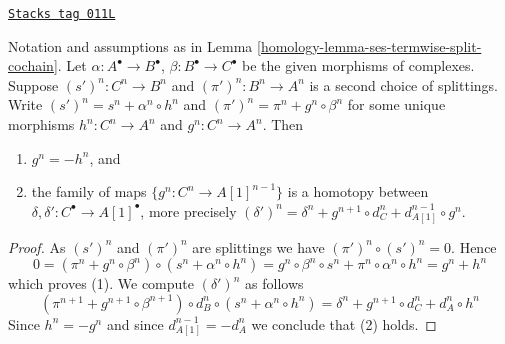 \begin{lemma}
\label{homology-lemma-ses-termwise-split-homotopy-cochain}
\href{https://stacks.math.columbia.edu/tag/011L}{\texttt{Stacks tag 011L}}

Notation and assumptions as in
Lemma \ref{homology-lemma-ses-termwise-split-cochain}.
Let $\alpha : A^\bullet \to B^\bullet$,
$\beta : B^\bullet \to C^\bullet$ be the given
morphisms of complexes.
Suppose $(s')^n : C^n \to B^n$ and $(\pi')^n : B^n \to A^n$
is a second choice of splittings.
Write $(s')^n = s^n + \alpha^n \circ h^n$ and
$(\pi')^n = \pi^n + g^n \circ \beta^n$ for some unique
morphisms $h^n : C^n \to A^n$ and $g^n : C^n \to A^n$. Then
\begin{enumerate}
\item $g^n = - h^n$, and
\item the family of maps $\{g^n : C^n \to A[1]^{n - 1}\}$ is a homotopy
between $\delta, \delta' : C^\bullet \to A[1]^\bullet$, more precisely
$(\delta')^n = \delta^n + g^{n + 1} \circ d_C^n + d_{A[1]}^{n - 1} \circ g^n$.
\end{enumerate}
\end{lemma}

\begin{proof}
As $(s')^n$ and $(\pi')^n$ are splittings we have $(\pi')^n \circ (s')^n = 0$.
Hence
$$
0 = ( \pi^n + g^n \circ \beta^n ) \circ ( s^n + \alpha^n \circ h^n ) =
g^n \circ \beta^n \circ s^n + \pi^n \circ \alpha^n \circ h^n =
g^n + h^n
$$
which proves (1). We compute $(\delta')^n$ as follows
$$
( \pi^{n + 1} + g^{n + 1} \circ \beta^{n + 1} )
\circ d_B^n \circ
( s^n + \alpha^n \circ h^n )
= \delta^n + g^{n + 1} \circ d_C^n + d_A^n \circ h^n
$$
Since $h^n = -g^n$ and since $d_{A[1]}^{n - 1} = -d_A^n$ we conclude that (2)
holds.
\end{proof}


